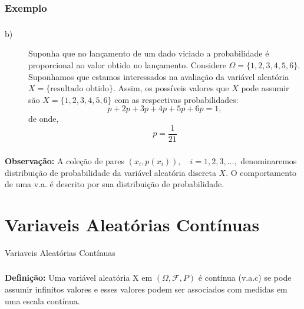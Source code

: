 \documentclass[14pt,aspectratio=1610]{beamer}
\begin{document}
\begin{frame}{}
\frametitle{Exemplo}
\begin{block}{}
\justifying
{}
\end{block}
\end{frame}

\begin{frame}{}
\frametitle{}
\small
\begin{block}{}
\justifying
\begin{description}
\item[b)] \justifying Suponha que no lançamento de um dado viciado a probabilidade é proporcional ao valor obtido no lançamento. Considere $\Omega=\{1,2,3,4,5,6\}.$ Suponhamos que estamos interessados na avaliação da variável aleatória $X=\{\textrm{resultado obtido}\}.$ Assim, os possíveis valores que $X$ pode assumir são $X=\{1,2,3,4,5,6\}$ com as respectivas probabilidades: $$p+2p+3p+4p+5p+6p=1,$$ de onde, $$p=\dfrac{1}{21}$$
\end{description}
\end{block}
\end{frame}

\begin{frame}{}
\frametitle{}
\begin{block}{}
\justifying
\textbf{Observação:} A coleção de pares $(x_{i}, p(x_{i})),\quad i=1,2,3,\ldots,$ de\-no\-mi\-na\-re\-mos distribuição de probabilidade da variável aleatória discreta $X.$ 
O comportamento de uma v.a. é descrito por sua distribuição de probabilidade.
\end{block}
\end{frame}

\section{Variaveis Aleatórias Contínuas}
\begin{frame}{Variaveis Aleatórias Contínuas}
\frametitle{}
\begin{block}{}
\justifying
\textbf{Definição:} Uma variável aleatória X em $(\Omega, \mathcal{F},P)$ é contínua (v.a.c) se pode assumir infinitos valores e esses valores podem ser associados com medidas em uma escala contínua.
\end{block}
\end{frame}
\end{document}
